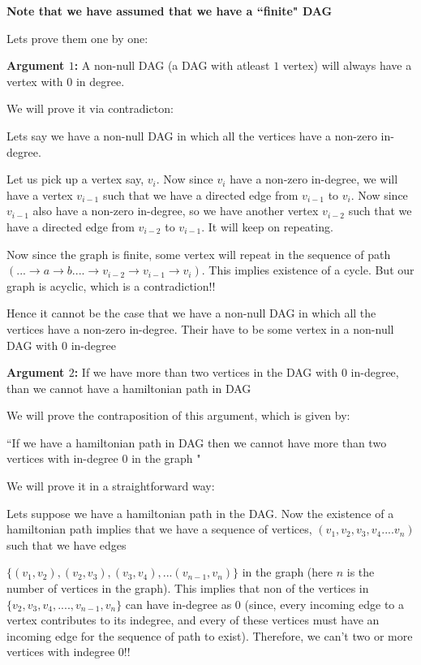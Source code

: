 \documentclass[answers]{exam}
\begin{document}
\begin{questions}
\begin{enumerate}
\begin{solution}
\textbf{Note that we have assumed that we have a ``finite" DAG}\par

Lets prove them one by one:

\textbf{Argument $1$:} A non-null DAG (a DAG with atleast $1$ vertex) will always have a vertex with $0$ in degree.\par

We will prove it via contradicton:

Lets say we have a non-null DAG in which all the vertices have a non-zero in-degree.\par
Let us pick up a vertex say, $v_i$. Now since $v_i$ have a non-zero in-degree, we will have a vertex $v_{i-1}$ such that we have a directed edge from $v_{i-1}$ to $v_i$. Now since $v_{i-1}$ also have a non-zero in-degree, so we have another vertex $v_{i-2}$ such that we have a directed edge from $v_{i-2}$ to $v_{i-1}$. It will keep on repeating. \par Now since the graph is finite, some vertex will repeat in the sequence of path $(...\rightarrow a\rightarrow b....\rightarrow v_{i-2}\rightarrow v_{i-1}\rightarrow v_{i})$. This implies existence of a cycle. But our graph is acyclic, which is a contradiction!!

Hence it cannot be the case that we have a non-null DAG in which all the vertices have a non-zero in-degree. Their have to be some vertex in a non-null DAG with $0$ in-degree

\textbf{Argument $2$:} If we have more than two vertices in the DAG with $0$ in-degree, than we cannot have a hamiltonian path in DAG

We will prove the contraposition of this argument, which is given by:\par
``If we have a hamiltonian path in DAG then we cannot have more than two vertices with in-degree $0$ in the graph " \par

We will prove it in a straightforward way:\par

Lets suppose we have a hamiltonian path in the DAG. Now the existence of a hamiltonian path implies that we have a sequence of vertices, $(v_1,v_2,v_3,v_4....v_n)$ such that we have edges\par $\{(v_1,v_2),(v_2,v_3),(v_3,v_4),...(v_{n-1},v_n)\}$ in the graph (here $n$ is the number of vertices in the graph). This implies that non of the vertices in $\{v_2,v_3,v_4,....,v_{n-1},v_n\}$ can have in-degree as $0$ (since, every incoming edge to a vertex contributes to its indegree, and every of these vertices must have an incoming edge for the sequence of path to exist). Therefore, we can't two or more vertices with indegree $0$!!\par


\end{solution}
\end{enumerate}
\end{questions}
\end{document}
